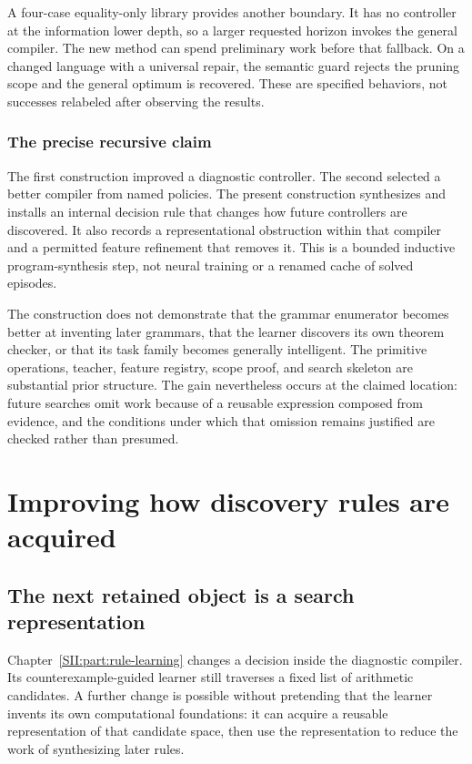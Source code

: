 A four-case equality-only library provides another boundary. It has no controller at the information lower depth, so a larger requested horizon invokes the general compiler. The new method can spend preliminary work before that fallback. On a changed language with a universal repair, the semantic guard rejects the pruning scope and the general optimum is recovered. These are specified behaviors, not successes relabeled after observing the results.



\subsection{The precise recursive claim}
The first construction improved a diagnostic controller. The second selected a better compiler from named policies. The present construction synthesizes and installs an internal decision rule that changes how future controllers are discovered. It also records a representational obstruction within that compiler and a permitted feature refinement that removes it. This is a bounded inductive program-synthesis step, not neural training or a renamed cache of solved episodes.

The construction does not demonstrate that the grammar enumerator becomes better at inventing later grammars, that the learner discovers its own theorem checker, or that its task family becomes generally intelligent. The primitive operations, teacher, feature registry, scope proof, and search skeleton are substantial prior structure. The gain nevertheless occurs at the claimed location: future searches omit work because of a reusable expression composed from evidence, and the conditions under which that omission remains justified are checked rather than presumed.



\chapter{Improving how discovery rules are acquired}\label{SII:book:chapter-63}
\label{SII:part:meta-acquisition}
\section{The next retained object is a search representation}\label{SII:sec:meta-acquisition}
Chapter~\ref{SII:part:rule-learning} changes a decision inside the diagnostic compiler. Its counterexample-guided learner still traverses a fixed list of arithmetic candidates. A further change is possible without pretending that the learner invents its own computational foundations: it can acquire a reusable representation of that candidate space, then use the representation to reduce the work of synthesizing later rules.

